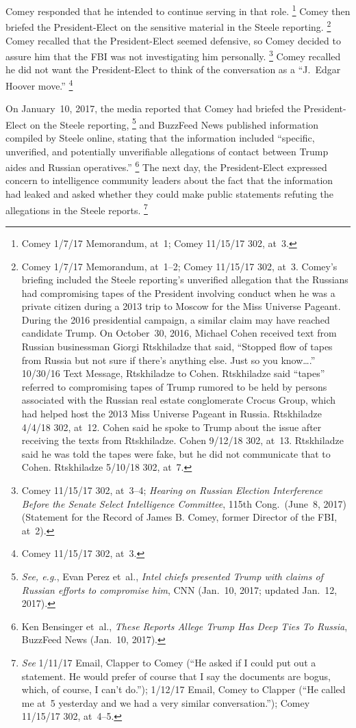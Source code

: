 Comey responded that he intended to continue serving in that role.%
\footnote{Comey 1/7/17 Memorandum, at~1;
Comey 11/15/17 302, at~3.}
Comey then briefed the President-Elect on the sensitive material in the Steele reporting.%
\footnote{Comey 1/7/17 Memorandum, at~1--2;
Comey 11/15/17 302, at~3.
Comey's briefing included the Steele reporting's unverified allegation that the Russians had compromising tapes of the President involving conduct when he was a private citizen during a 2013 trip to Moscow for the Miss Universe Pageant.
During the 2016 presidential campaign, a similar claim may have reached candidate Trump.
On October~30, 2016, Michael Cohen received text from Russian businessman Giorgi Rtskhiladze that said, ``Stopped flow of tapes from Russia but not sure if there's anything else.
Just so you know\dots.'' 10/30/16 Text Message, Rtskhiladze to Cohen.
Rtskhiladze said ``tapes'' referred to compromising tapes of Trump rumored to be held by persons associated with the Russian real estate conglomerate Crocus Group, which had helped host the 2013 Miss Universe Pageant in Russia.
Rtskhiladze 4/4/18 302, at~12.
Cohen said he spoke to Trump about the issue after receiving the texts from Rtskhiladze.
Cohen 9/12/18 302, at~13.
Rtskhiladze said he was told the tapes were fake, but he did not communicate that to Cohen.
Rtskhiladze 5/10/18 302, at~7.}
Comey recalled that the President-Elect seemed defensive, so Comey decided to assure him that the FBI was not investigating him personally.%
\footnote{Comey 11/15/17 302, at~3--4;
\textit{Hearing on Russian Election Interference Before the Senate Select Intelligence Committee}, 115th Cong.\ (June~8, 2017) (Statement for the Record of James B. Comey, former Director of the FBI, at~2).}
Comey recalled he did not want the President-Elect to think of the conversation as a ``J.~Edgar Hoover move.''%
\footnote{Comey 11/15/17 302, at~3.}

On January~10, 2017, the media reported that Comey had briefed the President-Elect on the Steele reporting,%
\footnote{\textit{See, e.g.}, Evan Perez et~al., \textit{Intel chiefs presented Trump with claims of Russian efforts to compromise him}, CNN (Jan.~10, 2017;
updated Jan.~12, 2017).}
and BuzzFeed News published information compiled by Steele online, stating that the information included ``specific, unverified, and potentially unverifiable allegations of contact between Trump aides and Russian operatives.''%
\footnote{Ken Bensinger et~al., \textit{These Reports Allege Trump Has Deep Ties To Russia}, BuzzFeed News (Jan.~10, 2017).}
The next day, the President-Elect expressed concern to intelligence community leaders about the fact that the information had leaked and asked whether they could make public statements refuting the allegations in the Steele reports.%
\footnote{\textit{See} 1/11/17 Email, Clapper to Comey (``He asked if I could put out a statement.
He would prefer of course that I say the documents are bogus, which, of course, I can't do.'');
1/12/17 Email, Comey to Clapper (``He called me at~5 yesterday and we had a very similar conversation.'');
Comey 11/15/17 302, at~4--5.}

